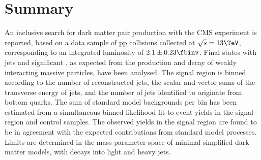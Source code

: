 \section{Summary}
\label{sec:summary}

An inclusive search for dark matter pair production with the CMS experiment is
reported, based on a data sample of pp collisions collected at
$\sqrt{s} = 13\TeV$, corresponding to an integrated luminosity of 
$2.1 \pm 0.23 \fbinv$. Final states with jets and
significant \met, as expected from the production and decay of weakly interacting massive particles, have been analysed.  
The signal region is binned
according to the number of reconstructed jets, the scalar and vector sums of the
transverse energy of jets, and the number of jets identified to
originate from bottom quarks. The sum of standard model backgrounds
per bin has been estimated from a simultaneous binned likelihood fit
to event yields in the signal region and control samples. 
The observed yields in the signal region are found to be in agreement
with the expected contributions from standard model processes. Limits
are determined in the mass parameter space of minimal simplified dark matter models, with decays into light and heavy jets.

